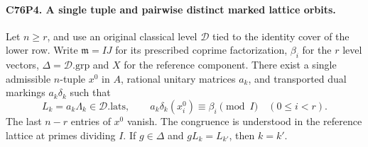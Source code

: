 \paragraph{C76P4. A single tuple and pairwise distinct marked lattice orbits.}
Let $n\ge r$, and use an original classical level $\mathcal D$ tied
to the identity cover of the lower row. Write $\mathfrak m=IJ$
for its prescribed coprime factorization, $\beta_i$ for the
$r$ level vectors, $\Delta=\mathcal D.\mathrm{grp}$ and $X$ for the
reference component. There exist a single admissible $n$-tuple
$x^0$ in $A$, rational unitary matrices $a_k$, and transported
dual markings $a_k\delta_k$ such that
\[
 L_k=a_k\Lambda_k\in\mathcal D.\mathrm{lats},\qquad
 a_k\delta_k(x^0_i)\equiv\beta_i\pmod I\quad(0\le i<r).
\]
The last $n-r$ entries of $x^0$ vanish. The congruence is understood
in the reference lattice at primes dividing $I$. If
$g\in\Delta$ and $gL_k=L_{k'}$, then $k=k'$.

